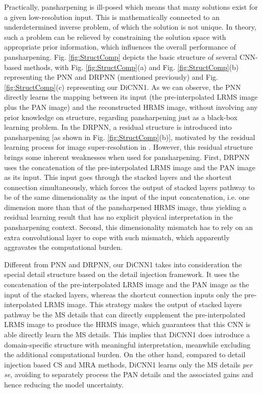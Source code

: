 \documentclass[journal]{IEEEtran}
\begin{document}
Practically, pansharpening is ill-posed which means that many solutions exist for a given low-resolution input. This is mathematically connected to an underdetermined inverse problem, of which the solution is not unique. In theory, such a problem can be relieved by constraining the solution space with appropriate prior information, which influences the overall performance of pansharpening. Fig. \ref{fig:StructComp} depicts the basic structure of several CNN-based methods, with Fig. \ref{fig:StructComp}(a) and Fig. \ref{fig:StructComp}(b) representing the PNN and DRPNN (mentioned previously) and Fig. \ref{fig:StructComp}(c) representing our DiCNN1. As we can observe, the PNN directly learns the mapping between its input (the pre-interpolated LRMS image plus the PAN image) and the reconstructed HRMS image, without involving any prior knowledge on structure, regarding pansharpening just as a black-box learning problem. In the DRPNN, a residual structure is introduced into pansharpening [as shown in Fig. \ref{fig:StructComp}(b)], motivated by the residual learning process for image super-resolution in \cite{SuperRes-CNN:Kim2016}. However, this residual structure brings some inherent weaknesses when used for pansharpening. First, DRPNN uses the concatenation of the pre-interpolated LRMS image and the PAN image as its input. This input goes through the stacked layers and the shortcut connection simultaneously, which forces the output of stacked layers pathway to be of the same dimensionality as the input of the input concatenation, i.e. one dimension more than that of the pansharpened HRMS image, thus yielding a residual learning result that has no explicit physical interpretation in the pansharpening context. Second, this dimensionality mismatch has to rely on an extra convolutional layer to cope with such mismatch, which apparently aggravates the computational burden.

Different from PNN and DRPNN, our DiCNN1 takes into consideration the special detail structure based on the detail injection framework. It uses the concatenation of the pre-interpolated LRMS image and the PAN image as the input of the stacked layers, whereas the shortcut connection inputs only the pre-interpolated LRMS image. This strategy makes the output of stacked layers pathway be the MS details that can directly supplement the pre-interpolated LRMS image to produce the HRMS image, which guarantees that this CNN is able directly learn the MS details. This implies that DiCNN1 does introduce a domain-specific structure with meaningful interpretation, meanwhile excluding the additional computational burden. On the other hand, compared to detail injection based CS and MRA methods, DiCNN1 learns only the MS details \emph{per se}, avoiding to separately process the PAN details and the associated gains and hence reducing the model uncertainty.
\end{document}
